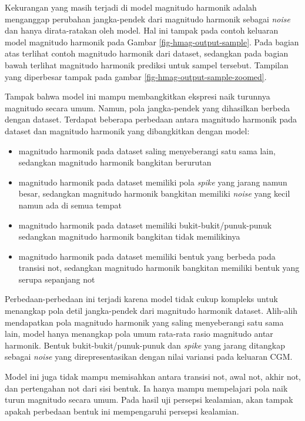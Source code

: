 Kekurangan yang masih terjadi di model magnitudo harmonik adalah menganggap perubahan jangka-pendek dari magnitudo harmonik sebagai \textit{noise} dan hanya dirata-ratakan oleh model. Hal ini tampak pada contoh keluaran model magnitudo harmonik pada Gambar \ref{fig-hmag-output-sample}. Pada bagian atas terlihat contoh magnitudo harmonik dari dataset, sedangkan pada bagian bawah terlihat magnitudo harmonik prediksi untuk sampel tersebut. Tampilan yang diperbesar tampak pada gambar \ref{fig-hmag-output-sample-zoomed}.

Tampak bahwa model ini mampu membangkitkan ekspresi naik turunnya magnitudo secara umum. Namun, pola jangka-pendek yang dihasilkan berbeda dengan dataset. Terdapat beberapa perbedaan antara magnitudo harmonik pada dataset dan magnitudo harmonik yang dibangkitkan dengan model:

\begin{itemize}
	\item magnitudo harmonik pada dataset saling menyeberangi satu sama lain, sedangkan magnitudo harmonik bangkitan berurutan
	\item magnitudo harmonik pada dataset memiliki pola \textit{spike} yang jarang namun besar, sedangkan magnitudo harmonik bangkitan memiliki \textit{noise} yang kecil namun ada di semua tempat
	\item magnitudo harmonik pada dataset memiliki bukit-bukit/punuk-punuk sedangkan magnitudo harmonik bangkitan tidak memilikinya
	\item magnitudo harmonik pada dataset memiliki bentuk yang berbeda pada transisi not, sedangkan magnitudo harmonik bangkitan memiliki bentuk yang serupa sepanjang not
\end{itemize}

Perbedaan-perbedaan ini terjadi karena model tidak cukup kompleks untuk menangkap pola detil jangka-pendek dari magnitudo harmonik dataset. Alih-alih mendapatkan pola magnitudo harmonik yang saling menyeberangi satu sama lain, model hanya menangkap pola umum rata-rata rasio magnitudo antar harmonik. Bentuk bukit-bukit/punuk-punuk dan \textit{spike} yang jarang ditangkap sebagai \textit{noise} yang direpresentasikan dengan nilai variansi pada keluaran CGM.

Model ini juga tidak mampu memisahkan antara transisi not, awal not, akhir not, dan pertengahan not dari sisi bentuk. Ia hanya mampu mempelajari pola naik turun magnitudo secara umum. Pada hasil uji persepsi kealamian, akan tampak apakah perbedaan bentuk ini mempengaruhi persepsi kealamian.

